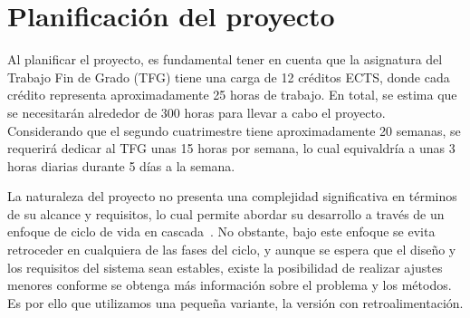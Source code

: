 \section{Planificación del proyecto}
Al planificar el proyecto, es fundamental tener en cuenta que la asignatura del 
Trabajo Fin de Grado (TFG) tiene una carga de 12 créditos ECTS, donde cada 
crédito representa aproximadamente 25 horas de trabajo. 
En total, se estima que se necesitarán alrededor de 300 horas para llevar a cabo 
el proyecto. Considerando que el segundo cuatrimestre tiene aproximadamente 20 semanas, 
se requerirá dedicar al TFG unas 15 horas por semana, lo cual equivaldría a unas 3 horas 
diarias durante 5 días a la semana.
 
La naturaleza del proyecto no presenta una complejidad significativa en términos 
de su alcance y requisitos, lo cual permite abordar su desarrollo a través de un 
enfoque de ciclo de vida en cascada~\cite{ModeloEnCascada}. 
No obstante, bajo este enfoque se evita retroceder en cualquiera de las fases 
del ciclo, y aunque se espera que el diseño y los requisitos del sistema sean 
estables, existe la posibilidad de realizar ajustes menores conforme se obtenga
más información sobre el problema y los métodos. 
Es por ello que utilizamos una pequeña variante, la versión con retroalimentación.
 
